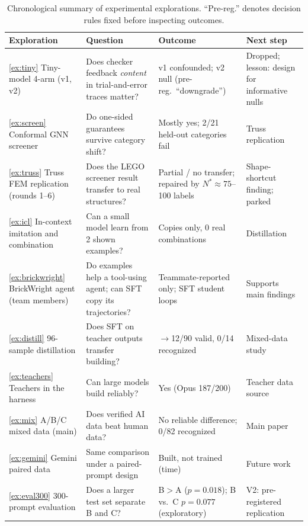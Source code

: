 \documentclass{article}
\begin{document}
\begin{table}[t]
\centering\small
\caption{Chronological summary of experimental explorations. ``Pre-reg.'' denotes decision rules fixed before inspecting outcomes.}
\label{tab:explore}
\setlength{\tabcolsep}{4pt}
\begin{tabularx}{\linewidth}{@{}*{4}{>{\raggedright\arraybackslash}X}@{}}
\toprule
Exploration & Question & Outcome & Next step \\
\midrule
\ref{ex:tiny} Tiny-model 4-arm (v1, v2) & Does checker feedback \emph{content} in trial-and-error traces matter? & v1 confounded; v2 null (pre-reg.\ ``downgrade'') & Dropped; lesson: design for informative nulls \\
\ref{ex:screen} Conformal GNN screener & Do one-sided guarantees survive category shift? & Mostly yes; 2/21 held-out categories fail & Truss replication \\
\ref{ex:truss} Truss FEM replication (rounds 1--6) & Does the LEGO screener result transfer to real structures? & Partial / no transfer; repaired by $N^\ast\!\approx\!75$--100 labels & Shape-shortcut finding; parked \\
\ref{ex:icl} In-context imitation and combination & Can a small model learn from 2 shown examples? & Copies only, 0 real combinations & Distillation \\
\ref{ex:brickwright} BrickWright agent (team members) & Do examples help a tool-using agent; can SFT copy its trajectories? & Teammate-reported only; SFT student loops & Supports main findings \\
\ref{ex:distill} 96-sample distillation & Does SFT on teacher outputs transfer building? & 0$\to$12/90 valid, 0/14 recognized & Mixed-data study \\
\ref{ex:teachers} Teachers in the harness & Can large models build reliably? & Yes (Opus 187/200) & Teacher data source \\
\ref{ex:mix} A/B/C mixed data (main) & Does verified AI data beat human data? & No reliable difference; 0/82 recognized & Main paper \\
\ref{ex:gemini} Gemini paired data & Same comparison under a paired-prompt design & Built, not trained (time) & Future work \\
\ref{ex:eval300} 300-prompt evaluation & Does a larger test set separate B and C? & B$>$A ($p=0.018$); B vs.\ C $p=0.077$ (exploratory) & V2: pre-registered replication \\
\bottomrule
\end{tabularx}
\end{table}
\end{document}
